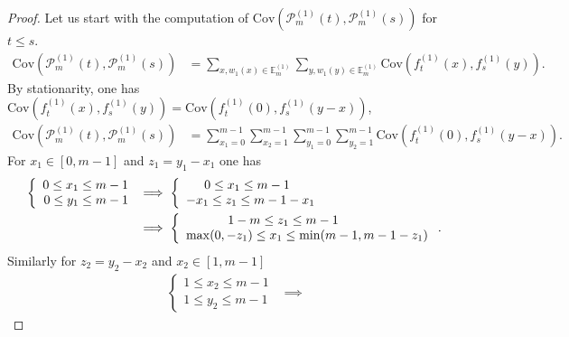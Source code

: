 \documentclass[12pt]{article}
\theoremstyle{Theorem}
\begin{document}
\begin{proof}
Let us start with the computation of $\text{Cov}(\mathcal{P}_{m}^{\scriptscriptstyle (1)}(t), \mathcal{P}_{m}^{\scriptscriptstyle (1)}(s))$ for $t \leq s$. 
\begin{align*}
\text{Cov}(\mathcal{P}_{m}^{\scriptscriptstyle (1)}(t), \mathcal{P}_{m}^{\scriptscriptstyle (1)}(s))& = \sum_{x, w_{1}(x) \in \mathbb{E}^{\scriptscriptstyle (1)}_{m}} \sum_{y, w_{1}(y) \in \mathbb{E}^{\scriptscriptstyle (1)}_{m}} \text{Cov}\left(f_{t}^{\scriptscriptstyle (1)}(x), f_{s}^{\scriptscriptstyle (1)}(y) \right).
\end{align*}
By stationarity, one has $\text{Cov}\left(f_{t}^{\scriptscriptstyle (1)}(x), f_{s}^{\scriptscriptstyle (1)}(y) \right)= \text{Cov}\left(f_{t}^{\scriptscriptstyle (1)}(0), f_{s}^{\scriptscriptstyle (1)}(y-x) \right)$, 
\begin{align*}
\text{Cov}\left(\mathcal{P}_{m}^{\scriptscriptstyle (1)}(t),\mathcal{P}_{m}^{\scriptscriptstyle (1)}(s) \right) & = \sum_{x_1 = 0}^{m-1}\sum_{x_2 = 1}^{m-1}\sum_{y_1 = 0}^{m-1}\sum_{y_2 = 1}^{m-1} \text{Cov}\left(f_{t}^{\scriptscriptstyle (1)}(0), f_{s}^{ \scriptscriptstyle (1)}(y-x) \right).
\end{align*}
For $x_1 \in [0,m-1]$ and $z_1 = y_1 - x_1$ one has
\begin{align*} 
\left\{
\begin{array}{rcl}
0 \leq x_1 \leq m-1 \\
0 \leq y_1 \leq m-1 
\end{array}\right.& \implies  \left\{ \begin{array}{rcl}
0 \leq x_1 \leq m-1 \hspace{0.7cm} \\
-x_1 \leq z_1 \leq m-1 - x_1
\end{array}\right. \\
& \implies  \left\{
\begin{array}{rcl}
1-m \leq z_1 \leq m-1 \hspace{2.5cm}  \\
\max(0, -z_1) \leq x_1 \leq \min(m-1 , m-1-z_1)
\end{array}\right..
\end{align*} 
Similarly for $z_2 = y_2 - x_2$ and $x_2 \in [1, m-1]$
\begin{align*}
 \left\{
\begin{array}{rcl}
1 \leq x_2 \leq m-1 \\
1 \leq y_2 \leq m-1 
\end{array}\right. & \implies

\end{align*}
\end{proof}
\end{document}
